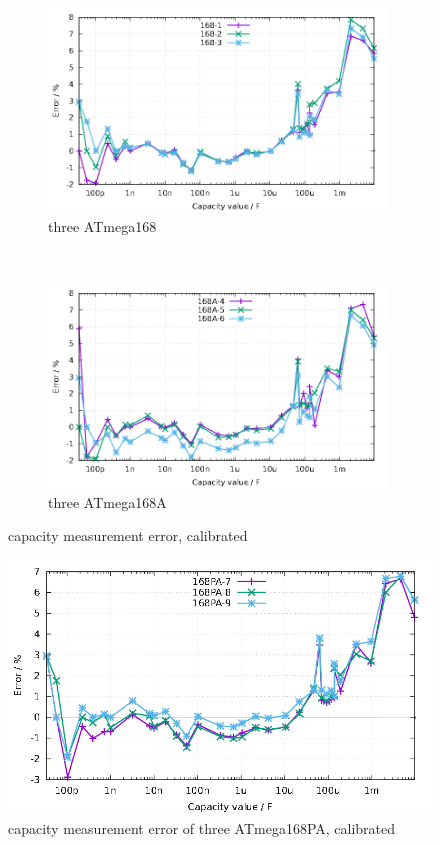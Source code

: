 \begin{figure}[H]
  \begin{subfigure}[b]{9cm}
    \centering
    \includegraphics[width=9cm]{../GNU/Mega168cal.pdf}
    \caption{three ATmega168}
    \label{fig:mega168cal}
  \end{subfigure}
  ~
  \begin{subfigure}[b]{9cm}
    \centering
    \includegraphics[width=9cm]{../GNU/Mega168Acal.pdf}
    \caption{three ATmega168A}
    \label{fig:mega168Acal}
  \end{subfigure}
  \caption{capacity measurement error, calibrated}
\end{figure}

\begin{figure}[H]
\centering
\includegraphics[width=16cm]{../GNU/Mega168PAcal.pdf}
\caption{capacity measurement error of three ATmega168PA, calibrated}
\label{fig:mega168PAcal}
\end{figure}

